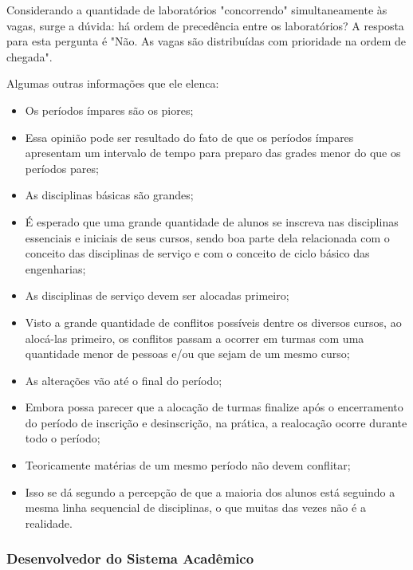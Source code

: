         Considerando a quantidade de laboratórios "concorrendo" simultaneamente às vagas, surge a dúvida: há ordem de precedência entre os laboratórios? A resposta para esta pergunta é "Não. As vagas são distribuídas com prioridade na ordem de chegada".

        Algumas outras informações que ele elenca:

        \begin{itemize}
            \item Os períodos ímpares são os piores;
            \item Essa opinião pode ser resultado do fato de que os períodos ímpares apresentam um intervalo de tempo para preparo das grades menor do que os períodos pares;
            \item As disciplinas básicas são grandes;
            \item É esperado que uma grande quantidade de alunos se inscreva nas disciplinas essenciais e iniciais de seus cursos, sendo boa parte dela relacionada com o conceito das disciplinas de serviço e com o conceito de ciclo básico das engenharias;
            \item As disciplinas de serviço devem ser alocadas primeiro;
            \item Visto a grande quantidade de conflitos possíveis dentre os diversos cursos, ao alocá-las primeiro, os conflitos passam a ocorrer em turmas com uma quantidade menor de pessoas e/ou que sejam de um mesmo curso;
            \item As alterações vão até o final do período;
            \item Embora possa parecer que a alocação de turmas finalize após o encerramento do período de inscrição e desinscrição, na prática, a realocação ocorre durante todo o período;
            \item Teoricamente matérias de um mesmo período não devem conflitar;
            \item Isso se dá segundo a percepção de que a maioria dos alunos está seguindo a mesma linha sequencial de disciplinas, o que muitas das vezes não é a realidade.
        \end{itemize}

    \subsubsection{Desenvolvedor do Sistema Acadêmico} %

